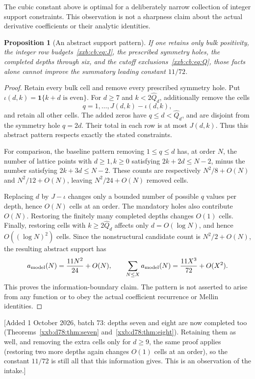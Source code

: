 \documentclass[11pt,a4paper]{article}
\numberwithin{equation}{section}
\newtheorem{proposition}[theorem]{Proposition}
\theoremstyle{definition}
\theoremstyle{remark}
\theoremstyle{plain}
\begin{document}
The cubic constant above is optimal for a deliberately narrow collection of
integer support constraints. This observation is not a sharpness claim about
the actual derivative coefficients or their analytic identities.

\begin{proposition}[An abstract support pattern]\label{xxb:cb:prop:sharpness}
If one retains only bulk positivity, the integer row
budgets~\eqref{xxb:cb:eq:J}, the prescribed symmetry holes, the completed
depths through six, and the cutoff exclusions~\eqref{xxb:cb:eq:Q}, those facts
alone cannot improve the summatory leading constant $11/72$.
\end{proposition}
\begin{proof}
Retain every bulk cell and remove every prescribed symmetry hole. Put
$\iota(d,k)=\mathbf1\{k+d\text{ is even}\}$. For $d\ge7$ and
$k<2\widehat Q_d$, additionally remove the cells
\[
 q=1,\ldots,J(d,k)-\iota(d,k),
\]
and retain all other cells. The added zeros have $q\le d<\widehat Q_d$, and
are disjoint from the symmetry hole $q=2d$. Their total in each row is at most
$J(d,k)$. Thus this abstract pattern respects exactly the stated constraints.

For comparison, the baseline pattern removing $1\le q\le d$ has, at order $N$,
the number of lattice points with $d\ge1,k\ge0$ satisfying $2k+2d\le N-2$,
minus the number satisfying $2k+3d\le N-2$. These counts are respectively
$N^2/8+O(N)$ and $N^2/12+O(N)$, leaving $N^2/24+O(N)$ removed cells.

Replacing $d$ by $J-\iota$ changes only a bounded number of possible $q$ values
per depth, hence $O(N)$ cells at an order. The mandatory holes also contribute
$O(N)$. Restoring the finitely many completed depths changes $O(1)$ cells.
Finally, restoring cells with $k\ge2\widehat Q_d$ affects only $d=O(\log N)$,
and hence $O((\log N)^2)$ cells. Since the nonstructural candidate count is
$N^2/2+O(N)$, the resulting abstract support has
\[
 a_{\rm model}(N)=\frac{11N^2}{24}+O(N),\qquad
 \sum_{N\le X}a_{\rm model}(N)=\frac{11X^3}{72}+O(X^2).
\]
This proves the information-boundary claim. The pattern is not asserted to
arise from any function or to obey the actual coefficient recurrence or Mellin
identities.
\end{proof}
[Added 1 October 2026, batch 73: depths seven and eight are now completed too
(Theorems~\ref{xxb:d78:thm:seven} and~\ref{xxb:d78:thm:eight}).  Retaining
them as well, and removing the extra cells only for $d\ge9$, the same proof
applies (restoring two more depths again changes $O(1)$ cells at an order),
so the constant $11/72$ is still all that this information gives.  This is an
observation of the intake.]
\end{document}
